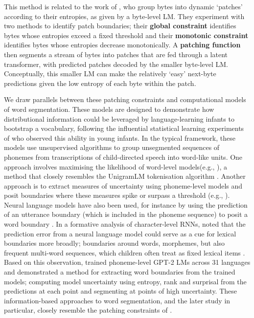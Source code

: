 This method is related to the work of \citet{pagnoni2024byte}, who group bytes into dynamic `patches' according to their entropies, as given by a byte-level LM. They experiment with two methods to identify patch boundaries; their \textbf{global constraint} identifies bytes whose entropies exceed a fixed threshold and their \textbf{monotonic constraint} identifies bytes whose entropies decrease monotonically. A \textbf{patching function} then segments a stream of bytes into patches that are fed through a latent transformer, with predicted patches decoded by the smaller byte-level LM. Conceptually, this smaller LM can make the relatively `easy' next-byte predictions given the low entropy of each byte within the patch. 


We draw parallels between these patching constraints and computational models of word segmentation. These models are designed to demonstrate how distributional information could be leveraged by language-learning infants to bootstrap a vocabulary, following the influential statistical learning experiments of \citet{Saffran1996learning} who observed this ability in young infants. In the typical framework, these models use unsupervised algorithms to group unsegmented sequences of phonemes from transcriptions of child-directed speech into word-like units. One approach involves maximising the likelihood of word-level \ngram models(e.g., \citealp{Brent1999, Venkataraman2001}), a method that closely resembles the UnigramLM tokenisation algorithm \citep{kudo-2018-unigram}. Another approach is to extract measures of uncertainty using phoneme-level \ngram models and posit boundaries where these measures spike or surpass a threshold (e.g., \citealp{ccoltekin2014explicit, goriely2023word}). Neural language models have also been used, for instance by using the prediction of an utterance boundary (which is included in the phoneme sequence) to posit a word boundary \citep{christiansen1998learning}. In a formative analysis of character-level RNNs, \citet{elman1990finding} noted that the prediction error from a neural language model could serve as a cue for lexical boundaries more broadly; boundaries around words, morphemes, but also frequent multi-word sequences, which children often treat as fixed lexical items \citep{macwhinney1978}. Based on this observation, \addcites trained phoneme-level GPT-2 LMs across 31 languages and demonstrated a method for extracting word boundaries from the trained models; computing model uncertainty using entropy, rank and surprisal from the predictions at each point and segmenting at points of high uncertainty. These information-based approaches to word segmentation, and the later study in particular, closely resemble the patching constraints of \citet{pagnoni2024byte}.

